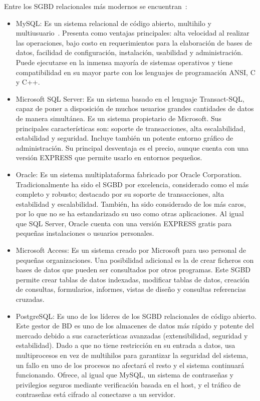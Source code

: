Entre los SGBD relacionales más modernos se encuentran~\cite{Losgesto13}:
\begin{itemize}
    \item MySQL: Es un sistema relacional de código abierto, multihilo y multiusuario~\cite{ian2003biblia}. Presenta como ventajas principales: alta velocidad al realizar las operaciones, bajo costo en requerimientos para la elaboración de bases de datos, facilidad de configuración, instalación, usabilidad y administración. Puede ejecutarse en la inmensa mayoría de sistemas operativos y tiene compatibilidad en su mayor parte con los lenguajes de programación ANSI, C y C++.
    
    \item Microsoft SQL Server: Es un sistema basado en el lenguaje Transact-SQL, capaz de poner a disposición de muchos usuarios grandes cantidades de datos de manera simultánea. Es un sistema propietario de Microsoft. Sus principales características son: soporte de transacciones, alta escalabilidad, estabilidad y seguridad. Incluye también un potente entorno gráfico de administración. Su principal desventaja es el precio, aunque cuenta con una versión EXPRESS que permite usarlo en entornos pequeños.
    
    \item Oracle: Es un sistema multiplataforma fabricado por Oracle Corporation. Tradicionalmente ha sido el SGBD por excelencia, considerado como el más completo y robusto; destacado por su soporte de transacciones, alta estabilidad y escalabilidad. También, ha sido considerado de los más caros, por lo que no se ha estandarizado su uso como otras aplicaciones. Al igual que SQL Server, Oracle cuenta con una versión EXPRESS gratis para pequeñas instalaciones o usuarios personales.
    
    \item Microsoft Access: Es un sistema creado por Microsoft para uso personal de pequeñas organizaciones. Una posibilidad adicional es la de crear ficheros con bases de datos que pueden ser consultados por otros programas. Este SGBD permite crear tablas de datos indexadas, modificar tablas de datos, creación de consultas, formularios, informes, vistas de diseño y consultas referencias cruzadas.
    
    \item PostgreSQL: Es uno de los líderes de los SGBD relacionales de código abierto. Este gestor de BD es uno de los almacenes de datos más rápido y potente del mercado debido a sus características avanzadas (extensibilidad, seguridad y estabilidad). Dado a que no tiene restricción en su entrada a datos, usa multiprocesos en vez de multihilos para garantizar la seguridad del sistema, un fallo en uno de los procesos no afectará el resto y el sistema continuará funcionando. Ofrece, al igual que MySQL, un sistema
    de contraseñas y privilegios seguros mediante verificación basada en el host, y el tráfico de contraseñas está cifrado al conectarse a un servidor.


\end{itemize}
